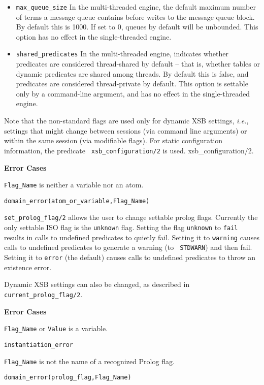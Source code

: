 \begin{description}
\begin{itemize}
\item {\tt max\_queue\_size} In the multi-threaded engine, the default
  maximum number of terms a message queue contains before writes to
  the message queue block.  By default this is 1000.  If set to 0,
  queues by default will be unbounded.  This option has no effect in
  the single-threaded engine.

\item {\tt shared\_predicates} In the multi-threaded engine, indicates
  whether predicates are considered thread-shared by default -- that
  is, whether tables or dynamic predicates are shared among threads.
  By default this is false, and predicates are considered
  thread-private by default.  This option is settable only by a
  command-line argument, and has no effect in the
  single-threaded engine.

\end{itemize}
    
Note that the non-standard flags are used only for dynamic XSB
settings, {\it i.e.}, settings that might change between sessions (via
command line arguments) or within the same session (via modifiable
flags).  For static configuration information, the predicate {\tt
  xsb\_configuration/2} is used. {xsb\_configuration/2}.

{\bf Error Cases}
\bi
\item 	{\tt Flag\_Name} is neither a variable nor an atom.
\bi
\item 	{\tt domain\_error(atom\_or\_variable,Flag\_Name)}
\ei
\ei

%
{\tt set\_prolog\_flag/2} allows the user to change settable prolog
flags.  Currently the only settable ISO flag is the {\tt unknown}
flag.  Setting the flag {\tt unknown} to {\tt fail} results in calls
to undefined predicates to quietly fail.  Setting it to {\tt warning}
causes calls to undefined predicates to generate a warning (to {\tt
  STDWARN}) and then fail.  Setting it to {\tt error} (the default)
causes calls to undefined predicates to throw an existence error.

Dynamic XSB settings can also be changed, as described in {\tt
  current\_prolog\_flag/2}.

{\bf Error Cases}
\bi
\item 	{\tt Flag\_Name} or {\tt Value} is a variable.
\bi
\item 	{\tt instantiation\_error}
\ei
%
\item 	{\tt Flag\_Name} is not the name of a recognized Prolog flag.
\bi
\item 	{\tt domain\_error(prolog\_flag,Flag\_Name)}
\ei
\ei


\end{description}
